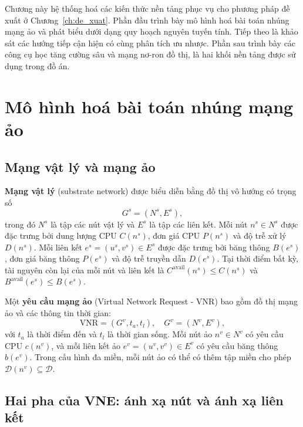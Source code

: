 \documentclass[../DoAn.tex]{subfiles}
\begin{document}
\label{ch:co_so}

Chương này hệ thống hoá các kiến thức nền tảng phục vụ cho phương pháp đề xuất ở Chương~\ref{ch:de_xuat}. Phần đầu trình bày mô hình hoá bài toán nhúng mạng ảo và phát biểu dưới dạng quy hoạch nguyên tuyến tính. Tiếp theo là khảo sát các hướng tiếp cận hiện có cùng phân tích ưu nhược. Phần sau trình bày các công cụ học tăng cường sâu và mạng nơ-ron đồ thị, là hai khối nền tảng được sử dụng trong đồ án.

\section{Mô hình hoá bài toán nhúng mạng ảo}
\label{sec:vne_model}

\subsection{Mạng vật lý và mạng ảo}

\textbf{Mạng vật lý} (substrate network) được biểu diễn bằng đồ thị vô hướng có trọng số
\[
    G^s = (N^s, E^s),
\]
trong đó $N^s$ là tập các nút vật lý và $E^s$ là tập các liên kết. Mỗi nút $n^s \in N^s$ được đặc trưng bởi dung lượng CPU $C(n^s)$, đơn giá CPU $P(n^s)$ và độ trễ xử lý $D(n^s)$. Mỗi liên kết $e^s = (u^s, v^s) \in E^s$ được đặc trưng bởi băng thông $B(e^s)$, đơn giá băng thông $P(e^s)$ và độ trễ truyền dẫn $D(e^s)$. Tại thời điểm bất kỳ, tài nguyên còn lại của mỗi nút và liên kết là $C^{\text{avail}}(n^s) \leq C(n^s)$ và $B^{\text{avail}}(e^s) \leq B(e^s)$.

Một \textbf{yêu cầu mạng ảo} (Virtual Network Request - VNR) bao gồm đồ thị mạng ảo và các thông tin thời gian:
\[
    \text{VNR} = (G^v, t_a, t_l), \quad G^v = (N^v, E^v),
\]
với $t_a$ là thời điểm đến và $t_l$ là thời gian sống. Mỗi nút ảo $n^v \in N^v$ có yêu cầu CPU $c(n^v)$, và mỗi liên kết ảo $e^v = (u^v, v^v) \in E^v$ có yêu cầu băng thông $b(e^v)$. Trong cấu hình đa miền, mỗi nút ảo có thể có thêm tập miền cho phép $\mathcal{D}(n^v) \subseteq \mathcal{D}$.

\subsection{Hai pha của VNE: ánh xạ nút và ánh xạ liên kết}
\end{document}
